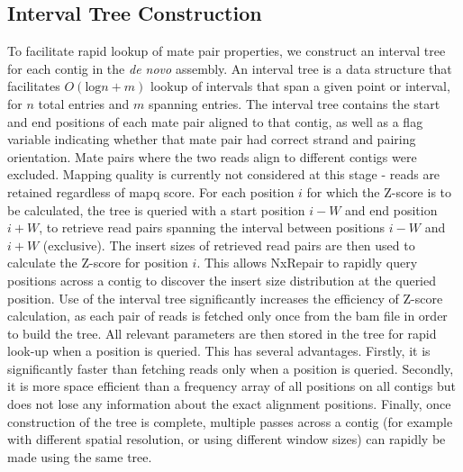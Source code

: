 \documentclass[fleqn,10pt]{wlpeerj}
\begin{document}
\subsection*{Interval Tree Construction}
To facilitate rapid lookup of mate pair properties, we construct an interval tree~\citep{cormen2009} for each contig in the \textit{de novo} assembly. An interval tree is a data structure that facilitates $O(\text{log} n + m)$ lookup of intervals that span a given point or interval, for $n$ total entries and $m$ spanning entries. The interval tree contains the start and end positions of each mate pair aligned to that contig, as well as a flag variable indicating whether that mate pair had correct strand and pairing orientation. Mate pairs where the two reads align to different contigs were excluded. Mapping quality is currently not considered at this stage - reads are retained regardless of mapq score. For each position $i$ for which the Z-score is to be calculated, the tree is queried with a start position $i-W$ and end position $i+W$, to retrieve read pairs spanning the interval between positions $i-W$ and $i+W$ (exclusive). The insert sizes of retrieved read pairs are then used to calculate the Z-score for position $i$. This allows NxRepair to rapidly query positions across a contig to discover the insert size distribution at the queried position. Use of the interval tree significantly increases the efficiency of Z-score calculation, as each pair of reads is fetched only once from the bam file in order to build the tree. All relevant parameters are then stored in the tree for rapid look-up when a position is queried. This has several advantages. Firstly, it is significantly faster than fetching reads only when a position is queried. Secondly, it is more space efficient than a frequency array of all positions on all contigs but does not lose any information about the exact alignment positions. Finally, once construction of the tree is complete, multiple passes across a contig (for example with different spatial resolution, or using different window sizes) can rapidly be made using the same tree.      
\end{document}
